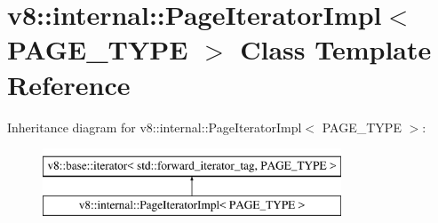 \hypertarget{classv8_1_1internal_1_1PageIteratorImpl}{}\section{v8\+:\+:internal\+:\+:Page\+Iterator\+Impl$<$ P\+A\+G\+E\+\_\+\+T\+Y\+PE $>$ Class Template Reference}
\label{classv8_1_1internal_1_1PageIteratorImpl}
Inheritance diagram for v8\+:\+:internal\+:\+:Page\+Iterator\+Impl$<$ P\+A\+G\+E\+\_\+\+T\+Y\+PE $>$\+:\begin{figure}[H]
\begin{center}
\leavevmode
\includegraphics[height=2.000000cm]{classv8_1_1internal_1_1PageIteratorImpl}
\end{center}
\end{figure}
